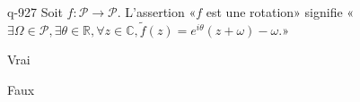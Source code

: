 \begin{truefalse}{q-927}
Soit $f:\mathcal P\to \mathcal P$. L'assertion «$f$ est une rotation» signifie «$\exists \Omega\in\mathcal P, \exists \theta\in\mathbb R, \forall z\in\mathbb C, \tilde f(z)=e^{i\theta}(z+\omega)-\omega$.»
\item Vrai
\item* Faux
\end{truefalse}

